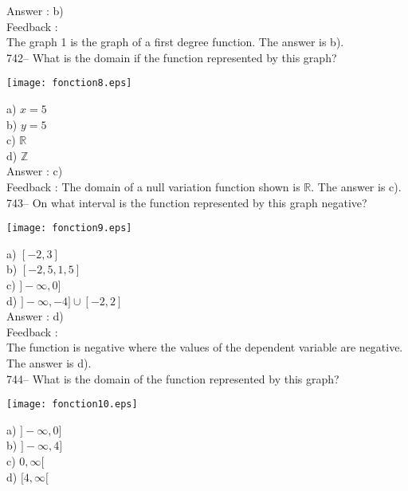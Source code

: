 \documentclass[letterpaper, 12pt]{article}
\begin{document}
Answer : b)\\

Feedback : \\
The graph 1 is the graph of a first degree function. The answer is b).\\

742-- What is the domain if the function represented by this graph?
    \begin{center}
    \texttt{[image: fonction8.eps]}
    \end{center}
a) $x=5$\\
b) $y=5$\\
c) $\mathbb{R}$\\
d) $\mathbb{Z}$\\

Answer : c)\\

Feedback :
The domain of a null variation function shown is $\mathbb{R}$.
  The answer is c).\\

743-- On what interval is the function represented by this graph negative?\\

    \begin{center}
    \texttt{[image: fonction9.eps]}
    \end{center}

a) $[-2, 3]$\\
b) $[-2,5, 1,5]$\\
c) $]-\infty,0]$\\
d) $]-\infty,-4]\cup[-2,2]$\\

Answer : d)\\

Feedback : \\
The function is negative where the values of the dependent variable are negative. The answer is d).\\

744-- What is the domain of the function represented by this graph?\\

    \begin{center}
    \texttt{[image: fonction10.eps]}
    \end{center}
a) $]-\infty,0]$\\
b) $]-\infty,4]$\\
c) $0,\infty[$\\
d) $[4, \infty[$\\
\end{document}

